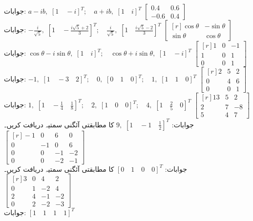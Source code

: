 جوابات:
$a-ib,\,\,[1 \quad -i]^T; \quad  a+ib,\,\, [1\quad i]^T $
\quad 
$\begin{bmatrix} 0.4&0.6\\-0.6&0.4  \end{bmatrix}$\\
جوابات:
$-\tfrac{i}{\sqrt{5}},\,\,[1 \quad -\tfrac{i\sqrt{5}+2}{3}]^T; \quad  \tfrac{i}{\sqrt{5}},\,\, [1 \quad \tfrac{i\sqrt{5}-2}{3}]^T $
\quad 
$\begin{bmatrix*}[r] \cos \theta&-\sin \theta\\\sin \theta&\cos \theta  \end{bmatrix*}$\\
جوابات:
$\cos \theta-i\sin \theta,\,\,[1 \quad i]^T; \quad  \cos \theta+i\sin \theta,\,\, [1 \quad -i]^T $
\quad 
$\begin{bmatrix*}[r]1&0&-1\\1&0&1\\0&0&1  \end{bmatrix*}$\\
جوابات:
$-1,\,\,[1 \quad -3 \quad 2]^T; \quad  0,\,\, [0\quad 1\quad 0]^T ; \quad  1,\,\, [1 \quad 1\quad 0]^T$
\quad 
$\begin{bmatrix*}[r]2&5&2\\0&4&6\\0&0&1  \end{bmatrix*}$\\
جوابات:
$1,\,\,[1 \quad -\tfrac{1}{4} \quad \tfrac{1}{8}]^T; \quad  2,\,\, [1\quad 0\quad 0]^T ; \quad  4,\,\, [1 \quad \tfrac{2}{5}\quad 0]^T$
\quad 
$\begin{bmatrix*}[r]13&5&2\\2&7&-8\\5&4&7  \end{bmatrix*}$\\
جوابات:
$9,\,\,[1 \quad -1 \quad \tfrac{1}{2}]^T$
\quad {} کا مطابقتی آئگنی سمتیہ دریافت کریں۔ 
$\begin{bmatrix*}[r]-1&0&6&0\\0&-1&0&6\\0&0&-1&-2\\0&0&-2&-1  \end{bmatrix*} $\\
جوابات:
$[0 \quad 1\quad 0\quad 0]^T$
\quad {} کا مطابقتی آئگنی سمتیہ دریافت کریں۔ 
$\begin{bmatrix*}[r]3&0&4&2\\0&1&-2&4\\2&4&-1&-2\\0&2&-2&-3  \end{bmatrix*} $\\
جوابات:
$[1 \quad 1\quad 1\quad 1]^T$

